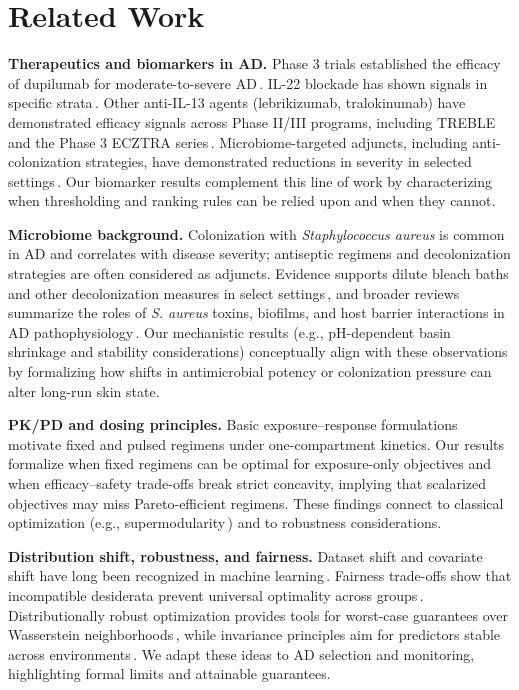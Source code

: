 \documentclass[11pt]{article}
\numberwithin{equation}{section}
\theoremstyle{plain}
\theoremstyle{definition}
\theoremstyle{remark}
\begin{document}
\section{Related Work}
\textbf{Therapeutics and biomarkers in AD.} Phase 3 trials established the efficacy of dupilumab for moderate-to-severe AD\,\cite{SimpsonNEJM2016}. IL-22 blockade has shown signals in specific strata\,\cite{FezakinumabJAAD2018}. Other anti-IL-13 agents (lebrikizumab, tralokinumab) have demonstrated efficacy signals across Phase II/III programs, including TREBLE and the Phase 3 ECZTRA series\,\cite{LebrikizumabTREBLE2018,LebrikizumabJAMA2020,TralokinumabBJD2020,TralokinumabECZTRA12BJD2021,TralokinumabECZTRA3BJD2021}. Microbiome-targeted adjuncts, including anti-colonization strategies, have demonstrated reductions in severity in selected settings\,\cite{HuangBleach2011}. Our biomarker results complement this line of work by characterizing when thresholding and ranking rules can be relied upon and when they cannot.

\textbf{Microbiome background.} Colonization with \textit{Staphylococcus aureus} is common in AD and correlates with disease severity; antiseptic regimens and decolonization strategies are often considered as adjuncts. Evidence supports dilute bleach baths and other decolonization measures in select settings\,\cite{HuangBleach2011}, and broader reviews summarize the roles of \textit{S. aureus} toxins, biofilms, and host barrier interactions in AD pathophysiology\,\cite{StaphInADChapter2008}. Our mechanistic results (e.g., pH-dependent basin shrinkage and stability considerations) conceptually align with these observations by formalizing how shifts in antimicrobial potency or colonization pressure can alter long-run skin state.

\textbf{PK/PD and dosing principles.} Basic exposure--response formulations motivate fixed and pulsed regimens under one-compartment kinetics. Our results formalize when fixed regimens can be optimal for exposure-only objectives and when efficacy--safety trade-offs break strict concavity, implying that scalarized objectives may miss Pareto-efficient regimens. These findings connect to classical optimization (e.g., supermodularity\,\cite{Topkis1998}) and to robustness considerations.

\textbf{Distribution shift, robustness, and fairness.} Dataset shift and covariate shift have long been recognized in machine learning\,\cite{DatasetShift2008,BenDavidEtAl2010}. Fairness trade-offs show that incompatible desiderata prevent universal optimality across groups\,\cite{KleinbergMullainathanRaghavan2017,HardtEquality2016}. Distributionally robust optimization provides tools for worst-case guarantees over Wasserstein neighborhoods\,\cite{EsfahaniKuhn2018}, while invariance principles aim for predictors stable across environments\,\cite{ArjovskyIRM2019}. We adapt these ideas to AD selection and monitoring, highlighting formal limits and attainable guarantees.
\end{document}

